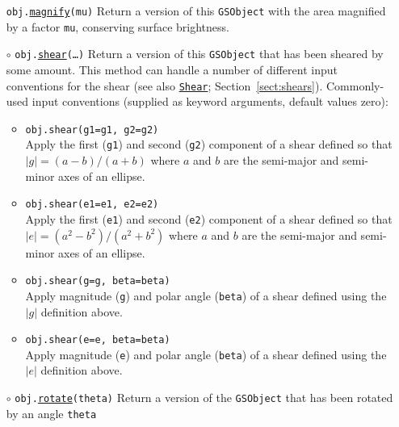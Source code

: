 \documentclass[preprint,10pt]{../../devel/modules/aastex}
\newcommand\Shear{\href{http://galsim-developers.github.io/GalSim/classgalsim_1_1shear_1_1_shear.html}{\texttt{Shear}}}
\begin{document}
\begin{itemize}
  \texttt{obj.}\href{http://galsim-developers.github.io/GalSim/classgalsim_1_1base_1_1_g_s_object.html#aac64da7ce1c4165ba048300fede29943}{\texttt{magnify}}\texttt{(mu)}
    \newline
    Return a version of this \texttt{GSObject} with the area magnified by a
    factor \texttt{mu}, conserving surface brightness.
  \item[$\circ$]
  \texttt{obj.}\href{http://galsim-developers.github.io/GalSim/classgalsim_1_1base_1_1_g_s_object.html#acc3ac16f75958b4a14246e944662ce3f}{\texttt{shear}}\texttt{(\dots)}
    \newline
    Return a version of this \texttt{GSObject} that has been sheared by some amount.
    This method can handle a number of different
    input conventions for the shear (see also \Shear;
    Section~\ref{sect:shears}).  Commonly-used input conventions
    (supplied as keyword arguments, default values zero):
    \begin{itemize}
    \item \texttt{obj.shear(g1=g1, g2=g2)} \\
      Apply the first (\texttt{g1}) and second (\texttt{g2}) component
      of a shear defined so that $|g| = (a - b) / (a + b)$ where $a$ and
      $b$ are the semi-major and semi-minor axes of an ellipse.
    \item \texttt{obj.shear(e1=e1, e2=e2)} \\
      Apply the first (\texttt{e1}) and second (\texttt{e2}) component
      of a shear defined so that $|e| = (a^2 - b^2) / (a^2 + b^2)$ where $a$ and
      $b$ are the semi-major and semi-minor axes of an ellipse.
    \item \texttt{obj.shear(g=g, beta=beta)} \\
      Apply magnitude (\texttt{g}) and polar angle (\texttt{beta}) of a
      shear defined using the $|g|$ definition above.
    \item \texttt{obj.shear(e=e, beta=beta)} \\
      Apply magnitude (\texttt{e}) and polar angle (\texttt{beta}) of a
      shear defined using the $|e|$ definition above.
    \end{itemize}
  \item[$\circ$]
  \texttt{obj.}\href{http://galsim-developers.github.io/GalSim/classgalsim_1_1base_1_1_g_s_object.html#a1733c2288686dd72f5389ede87e8aac3}{\texttt{rotate}}\texttt{(theta)}
    \newline
    Return a version of the \texttt{GSObject} that has been rotated by an angle \texttt{theta}

\end{itemize}
\end{document}

